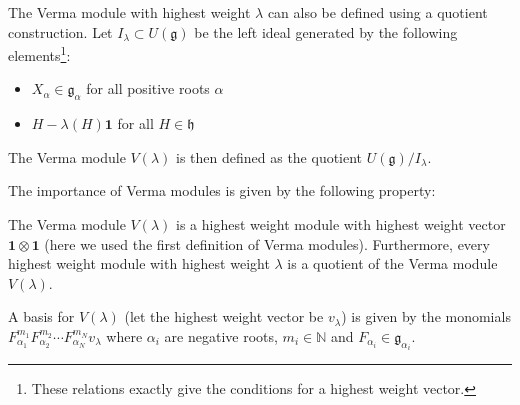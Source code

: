         \begin{adefinition}
        	The Verma module with highest weight $\lambda$ can also be defined using a quotient construction. Let $I_\lambda\subset U(\mathfrak{g})$ be the left ideal generated by the following elements\footnote{These relations exactly give the conditions for a highest weight vector.}:
        	\begin{itemize}
        		\item $X_\alpha\in\mathfrak{g_\alpha}$ for all positive roots $\alpha$
        		\item $H-\lambda(H)\mathbf{1}$ for all $H\in\mathfrak{h}$
        	\end{itemize}
        	The Verma module $V(\lambda)$ is then defined as the quotient $U(\mathfrak{g})/I_\lambda$.
        \end{adefinition}
        
        The importance of Verma modules is given by the following property:
        \begin{property}
        	The Verma module $V(\lambda)$ is a highest weight module with highest weight vector $\mathbf{1}\otimes\mathbf{1}$ (here we used the first definition of Verma modules). Furthermore, every highest weight module with highest weight $\lambda$ is a quotient of the Verma module $V(\lambda)$.
        \end{property}
        
        \begin{property}
	         A basis for $V(\lambda)$ (let the highest weight vector be $v_\lambda$) is given by the monomials $F_{\alpha_1}^{m_1}F_{\alpha_2}^{m_2}\cdots F_{\alpha_N}^{m_N}v_\lambda$ where $\alpha_i$ are negative roots, $m_i\in\mathbb{N}$ and $F_{\alpha_i}\in\mathfrak{g}_{\alpha_i}$.
        \end{property}
        

